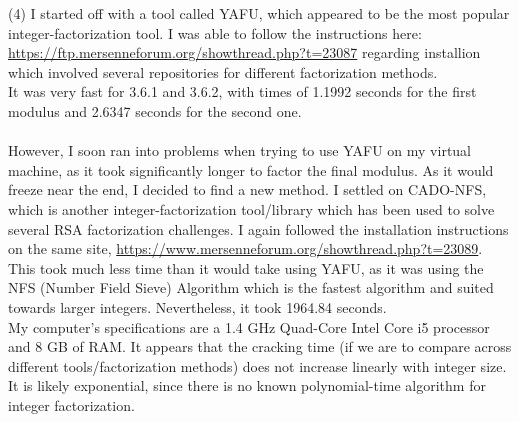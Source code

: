 \documentclass[a4paper,11pt]{article}
\theoremstyle{mytheor}
\begin{document}
\noindent (4) I started off with a tool called YAFU, which appeared to be the most popular integer-factorization tool. I was able to follow the instructions here: \href{https://ftp.mersenneforum.org/showthread.php?t=23087}{https://ftp.mersenneforum.org/showthread.php?t=23087}
 regarding installion which involved several repositories for different factorization methods. \\
 It was very fast for 3.6.1 and 3.6.2, with times of 1.1992 seconds for the first modulus and 2.6347 seconds for the second one. \\
 \\However, I soon ran into problems when trying to use YAFU on my virtual machine, as it took significantly longer to factor the final modulus. As it would freeze near the end, I decided to find a new method. I settled on CADO-NFS, which is another integer-factorization tool/library which has been used to solve several RSA factorization challenges. I again followed the installation instructions on the same site, \href{https://www.mersenneforum.org/showthread.php?t=23089}{https://www.mersenneforum.org/showthread.php?t=23089}. This took much less time than it would take using YAFU, as it was using the NFS (Number Field Sieve) Algorithm which is the fastest algorithm and suited towards larger integers. Nevertheless, it took 1964.84 seconds.
 \\ My computer's specifications are a 1.4 GHz Quad-Core Intel Core i5 processor and 8 GB of RAM. It appears that the cracking time (if we are to compare across different tools/factorization methods) does not increase linearly with integer size. It is likely exponential, since there is no known polynomial-time algorithm for integer factorization.
\end{document}

